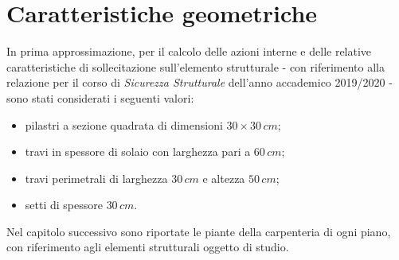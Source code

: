 \section{Caratteristiche geometriche}\label{sec:geomCar}
In prima approssimazione, per il calcolo delle azioni interne e delle relative caratteristiche di sollecitazione sull'elemento strutturale - con riferimento alla relazione per il corso di \emph{Sicurezza Strutturale} dell'anno accademico 2019/2020 - sono stati considerati i seguenti valori:
\begin{itemize}
 \item pilastri a sezione quadrata di dimensioni $30 \times 30\,\si{cm}$;
 \item travi in spessore di solaio con larghezza pari a $60\,\si{cm}$;
 \item travi perimetrali di larghezza $30\,\si{cm}$ e altezza $50\,\si{cm}$;
 \item setti di spessore $30\,\si{cm}$.
\end{itemize}

Nel capitolo successivo sono riportate le piante della carpenteria di ogni piano, con riferimento agli elementi strutturali oggetto di studio.

